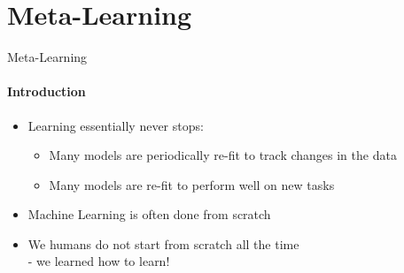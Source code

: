 \section{Meta-Learning}
\begin{frame}[c]{Meta-Learning}
\framesubtitle{Introduction}

\begin{itemize}
	\item Learning essentially never stops:
	\begin{itemize}
		\item Many models are periodically re-fit to track changes in the data
		\item Many models are re-fit to perform well on new tasks
	\end{itemize}
	
    \item Machine Learning is often done from scratch
    
    \item We humans do not start from scratch all the time \\ - we learned how to learn!
\end{itemize}

\end{frame}

	

